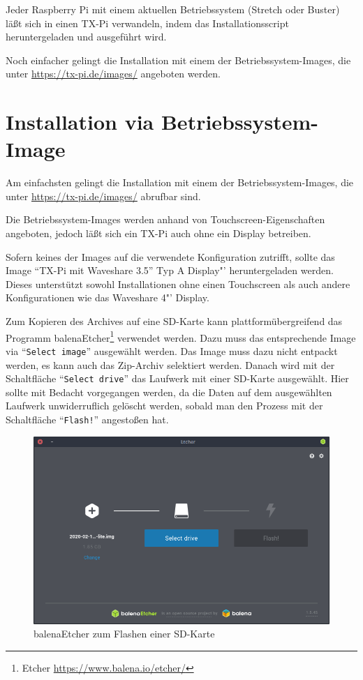 \documentclass[
  paper=A4,
  ngerman,
  fontsize=12pt,
  parskip=half-,
]{scrbook}
\begin{document}
Jeder Raspberry Pi mit einem aktuellen Betriebssystem (Stretch oder Buster) läßt 
sich in einen TX-Pi verwandeln, indem das Installationsscript heruntergeladen
und ausgeführt wird.

Noch einfacher gelingt die Installation mit einem der Betriebssystem-Images,
die unter \url{https://tx-pi.de/images/} angeboten werden.

\section{Installation via Betriebssystem-Image}
\label{sec:image}

Am einfachsten gelingt die Installation mit einem der Betriebssystem-Images,
die unter \url{https://tx-pi.de/images/} abrufbar sind.

Die Betriebssystem-Images werden anhand von Touchscreen-Eigenschaften 
angeboten, jedoch läßt sich ein TX-Pi auch ohne ein Display
betreiben.

Sofern keines der Images auf die verwendete Konfiguration zutrifft, 
sollte das Image "`TX-Pi mit Waveshare 3.5"' Typ A Display"'  heruntergeladen werden. 
Dieses unterstützt sowohl Installationen ohne einen 
Touchscreen als auch andere Konfigurationen wie das Waveshare
4"' Display.

Zum Kopieren des Archives auf eine SD-Karte kann plattformübergreifend
das Programm balenaEtcher\footnote{Etcher \url{https://www.balena.io/etcher/}} verwendet werden.
Dazu muss das entsprechende Image via "`\texttt{Select image}"' ausgewählt
werden. Das Image muss dazu nicht entpackt werden, es kann auch das
Zip-Archiv selektiert werden. Danach wird mit der Schaltfläche "`\texttt{Select drive}"'
das Laufwerk mit einer SD-Karte ausgewählt. Hier sollte mit Bedacht vorgegangen
werden, da die Daten auf dem ausgewählten Laufwerk unwiderruflich gelöscht
werden, sobald man den Prozess mit der Schaltfläche "`\texttt{Flash!}"' angestoßen
hat.
\clearpage

\begin{figure}[ht]
\centering
\includegraphics[scale=0.45]{images/etcher.png}
\caption{balenaEtcher zum Flashen einer SD-Karte}
\end{figure}
\end{document}
